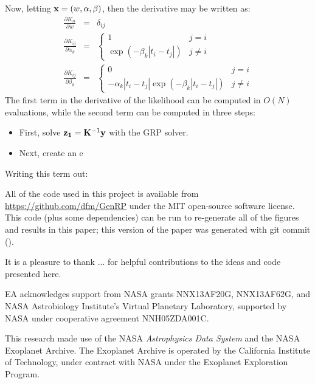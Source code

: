 \documentclass[manuscript, letterpaper]{aastex6}
\makeatletter
\let\origsection\section
\renewcommand\section{\@ifstar{\starsection}{\nostarsection}}
\newcommand\nostarsection[1]{\sectionprelude\origsection{#1}}
\newcommand\starsection[1]{\sectionprelude\origsection*{#1}}
\newcommand\sectionprelude{\vspace{1em}}
\newcommand{\project}[1]{\textsl{#1}}
\makeatother
\begin{document}
Now, letting ${\bf x} = (w,{\bf \alpha},{\bf \beta})$, then the derivative may be written as:
\begin{eqnarray}
    \frac{\partial K_{ii}}{\partial w} &=& \delta_{ij}\\
    \frac{\partial K_{ij}}{\partial \alpha_k} &=&
     \left\{
    \begin{array}{cc}
       1 & j = i \\
        \exp{(-\beta_k |t_i-t_j|)}  & j \ne i
    \end{array}
    \right.\\
    \frac{\partial K_{ij}}{\partial \beta_k} &=&
     \left\{
    \begin{array}{cc}
       0  & j = i \\
        -\alpha_k|t_i-t_j|\exp{(-\beta_k |t_i-t_j|)}  & j \ne i
    \end{array}
    \right.
\end{eqnarray}
The first term in the derivative of the likelihood can be computed in $O(N)$
evaluations, while the second term can be computed in three steps:
\begin{itemize}
\item First, solve ${\bf z_1} = {\bf K}^{-1}{\bf y}$ with the GRP solver.
\item Next, create an e
\end{itemize}
Writing this term out:

\section{Summary}

\vspace{1.5em}
All of the code used in this project is available from
\url{https://github.com/dfm/GenRP} under the MIT open-source software
license.
This code (plus some dependencies) can be run to re-generate all of the
figures and results in this paper; this version of the paper was generated
with git commit \texttt{\githash} (\gitdate).


\acknowledgments
It is a pleasure to thank
...
for helpful contributions to the ideas and code presented here.

EA acknowledges support from NASA grants NNX13AF20G, NNX13AF62G, and
NASA Astrobiology Institute’s Virtual Planetary Laboratory, supported
by NASA under cooperative agreement NNH05ZDA001C.

This research made use of the NASA \project{Astrophysics Data System} and the
NASA Exoplanet Archive.
The Exoplanet Archive is operated by the California Institute of Technology,
under contract with NASA under the Exoplanet Exploration Program.
\end{document}
